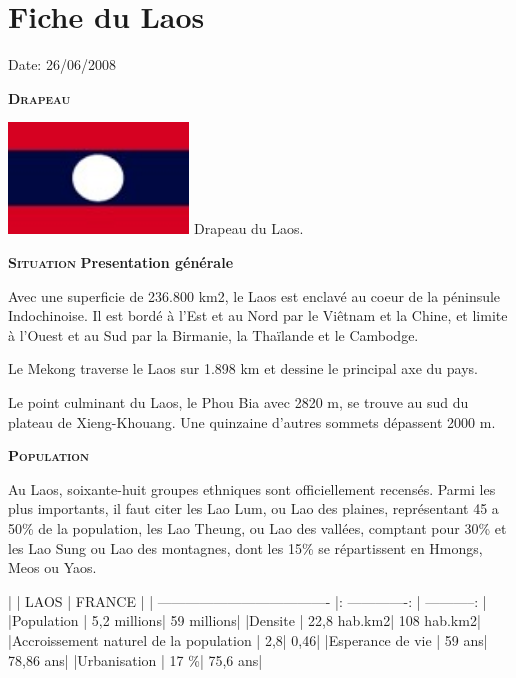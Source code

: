 \section{Fiche du Laos}

Date: 26/06/2008

\begin{multicols}{2}

\textbf{\textsc{Drapeau}}

\hspace*{-0.65cm}
\includegraphics[width=4.8cm]{articles/Fiche-du-laos/1214470058Q382.jpg}
Drapeau du Laos.


\textbf{\textsc{Situation}}
\textbf{Presentation générale}

Avec une superficie de 236.800 km2, le Laos est enclavé au coeur de la péninsule Indochinoise. Il est bordé à l’Est et au Nord par le Viêtnam et la Chine, et limite à l’Ouest et au Sud par la Birmanie, la Thaïlande et le Cambodge.

Le Mekong traverse le Laos sur 1.898 km et dessine le principal axe du pays.

Le point culminant du Laos, le Phou Bia avec 2820 m, se trouve au sud du plateau de Xieng-Khouang. Une quinzaine d’autres sommets dépassent 2000 m.

\textbf{\textsc{Population}}

Au Laos, soixante-huit groupes ethniques sont officiellement recensés. Parmi les plus importants, il faut citer les Lao Lum, ou Lao des plaines, représentant 45 a 50\% de la population, les Lao Theung, ou Lao des vallées, comptant pour 30\% et les Lao Sung ou Lao des montagnes, dont les 15\% se répartissent en Hmongs, Meos ou Yaos.

|                                       |       LAOS      |    FRANCE    |
| ------------------------------------- |: -------------: | -----------: |
|Population                             |     5,2 millions|  	59 millions|
|Densite                                |     22,8 hab.km2|   108 hab.km2|
|Accroissement naturel de la population |              2,8|          0,46|
|Esperance de vie                       |           59 ans|     78,86 ans|
|Urbanisation                           |            17 \%|      75,6 ans|


\end{multicols}
